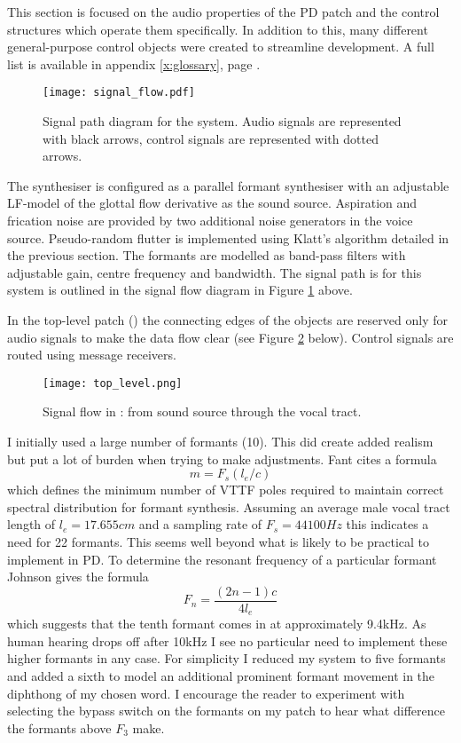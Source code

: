 This section is focused on the audio properties of the PD patch and the control structures which operate them specifically. In addition to this, many different general-purpose control objects were created to streamline development. A full list is available in appendix \ref{x:glossary}, page \pageref{x:glossary}.
%
\begin{figure}[H]
	\texttt{[image: signal\_flow.pdf]}
	\caption{Signal path diagram for the system. Audio signals are represented with black arrows, control signals are represented with dotted arrows.}
	\label{fig:signal_path}
\end{figure}
%
The synthesiser is configured as a parallel formant synthesiser with an adjustable LF-model of the glottal flow derivative as the sound source. Aspiration and frication noise are provided by two additional noise generators in the voice source. Pseudo-random flutter is implemented using Klatt's algorithm detailed in the previous section. The formants are modelled as band-pass filters with adjustable gain, centre frequency and bandwidth. The signal path is for this system is outlined in the signal flow diagram in Figure \ref{fig:signal_path} above.

In the top-level patch () the connecting edges of the objects are reserved only for audio signals to make the data flow clear (see Figure \ref{fig:top_level} below). Control signals are routed using message receivers.
%
\begin{figure}[H]
	\texttt{[image: top\_level.png]}
	\caption{Signal flow in : from sound source through the vocal tract.}
	\label{fig:top_level}
\end{figure}
%
I initially used a large number of formants (10). This did create added realism but put a lot of burden when trying to make adjustments. Fant \cite{Fant1995} cites a formula
%
\begin{equation}
	m = F_s(l_e / c)
\end{equation}
%
which defines the minimum number of VTTF poles required to maintain correct spectral distribution for formant synthesis. Assuming an average male vocal tract length of $l_e=17.65\si{5cm}$ and a sampling rate of $F_s = \si{44100Hz}$ this indicates a need for 22 formants. This seems well beyond what is likely to be practical to implement in PD. To determine the resonant frequency of a particular formant Johnson \cite{Johnson2003} gives the formula
%
\begin{equation}
	F_n = \frac{(2n-1)c}{4l_e}
\end{equation}
%
which suggests that the tenth formant comes in at approximately 9.4kHz. As human hearing drops off after 10kHz I see no particular need to implement these higher formants in any case. For simplicity I reduced my system to five formants and added a sixth to model an additional prominent formant movement in the diphthong of my chosen word. I encourage the reader to experiment with selecting the bypass switch on the formants on my patch to hear what difference the formants above $F_3$ make.

